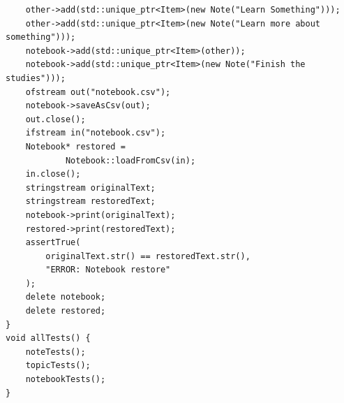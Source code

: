 \documentclass[8pt,twocolumn]{extarticle}
\begin{document}
\begin{lstlisting}
    other->add(std::unique_ptr<Item>(new Note("Learn Something")));
    other->add(std::unique_ptr<Item>(new Note("Learn more about something")));
    notebook->add(std::unique_ptr<Item>(other));
    notebook->add(std::unique_ptr<Item>(new Note("Finish the studies")));
    ofstream out("notebook.csv");
    notebook->saveAsCsv(out);
    out.close();
    ifstream in("notebook.csv");
    Notebook* restored =
            Notebook::loadFromCsv(in);
    in.close();
    stringstream originalText;
    stringstream restoredText;
    notebook->print(originalText);
    restored->print(restoredText);
    assertTrue(
        originalText.str() == restoredText.str(),
        "ERROR: Notebook restore"
    );
    delete notebook;
    delete restored;
}
void allTests() {
    noteTests();
    topicTests();
    notebookTests();
}
\end{lstlisting}
\end{document}
